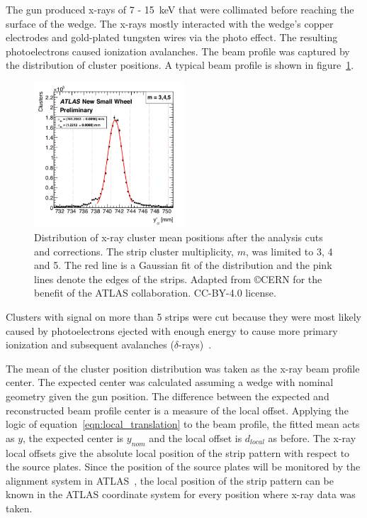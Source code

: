 
The gun produced x-rays of 7 - \SI{15}{\kilo\electronvolt} that were collimated before reaching the surface of the wedge. The x-rays mostly interacted with the wedge's copper electrodes and gold-plated tungsten wires via the photo effect. The resulting photoelectrons caused ionization avalanches. The beam profile was captured by the distribution of cluster positions. A typical beam profile is shown in figure~\ref{fig:xray_beam_profile}.

\begin{figure}
    \centering
    \includegraphics[width = 0.5\textwidth]{figures/figure_xray_beam_profile.pdf}
    \caption{Distribution of x-ray cluster mean positions after the analysis cuts and corrections. The strip cluster multiplicity, $m$, was limited to 3, 4 and 5. The red line is a Gaussian fit of the distribution and the pink lines denote the edges of the strips. Adapted from \copyright CERN for the benefit of the ATLAS collaboration. CC-BY-4.0 license.}
    \label{fig:xray_beam_profile}
\end{figure}

Clusters with signal on more than 5 strips were cut because they were most likely caused by photoelectrons ejected with enough energy to cause more primary ionization and subsequent avalanches ($\delta$-rays)~\cite{lefebvre_precision_2020}.

The mean of the cluster position distribution was taken as the x-ray beam profile center. The expected center was calculated assuming a wedge with nominal geometry given the gun position. The difference between the expected and reconstructed beam profile center is a measure of the local offset. Applying the logic of equation~\ref{eqn:local_translation} to the beam profile, the fitted mean acts as $y$, the expected center is $y_{nom}$ and the local offset is $d_{local}$ as before. The x-ray local offsets  give the absolute local position of the strip pattern with respect to the source plates. Since the position of the source plates will be monitored by the alignment system in ATLAS~\cite{nsw_tdr}, the local position of the strip pattern can be known in the ATLAS coordinate system for every position where x-ray data was taken.

